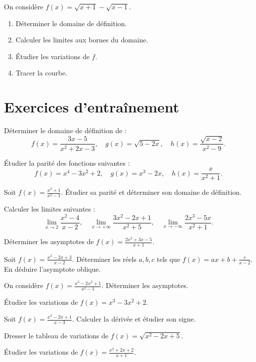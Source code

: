 \exo{}
On considère \(f(x)=\sqrt{x+1}-\sqrt{x-1}\).
\begin{enumerate}[label=\alph*)]
\item Déterminer le domaine de définition.
\item Calculer les limites aux bornes du domaine.
\item Étudier les variations de \(f\).
\item Tracer la courbe.
\end{enumerate}

\section{Exercices d'entraînement}


\exo{}
Déterminer le domaine de définition de :
\[
f(x)=\frac{3x-5}{x^2+2x-3},\quad g(x)=\sqrt{5-2x},\quad h(x)=\frac{\sqrt{x-2}}{x^2-9}.
\]

\exo{}
Étudier la parité des fonctions suivantes :
\[
f(x)=x^4-3x^2+2,\quad g(x)=x^3-2x,\quad h(x)=\frac{x}{x^2+1}.
\]

\exo{}
Soit \(f(x)=\frac{x^2+1}{x^2-1}\). Étudier sa parité et déterminer son domaine de définition.


\exo{}
Calculer les limites suivantes :
\[
\lim_{x\to 2}\frac{x^2-4}{x-2},\quad \lim_{x\to +\infty}\frac{3x^2-2x+1}{x^2+5},\quad \lim_{x\to -\infty}\frac{2x^3-5x}{x^2+1}.
\]

\exo{}
Déterminer les asymptotes de \(f(x)=\frac{2x^2+3x-5}{x+1}\).

\exo{}
Soit \(f(x)=\frac{x^2-2x+3}{x-2}\). Déterminer les réels \(a,b,c\) tels que \(f(x)=ax+b+\frac{c}{x-2}\). En déduire l'asymptote oblique.

\exo{}
On considère \(f(x)=\frac{x^3-2x^2+1}{x^2-1}\). Déterminer les asymptotes.


\exo{}
Étudier les variations de \(f(x)=x^3-3x^2+2\).

\exo{}
Soit \(f(x)=\frac{x^2-2x+1}{x-3}\). Calculer la dérivée et étudier son signe.

\exo{}
Dresser le tableau de variations de \(f(x)=\sqrt{x^2-2x+5}\).

\exo{}
Étudier les variations de \(f(x)=\frac{x^2+2x+2}{x+1}\).

